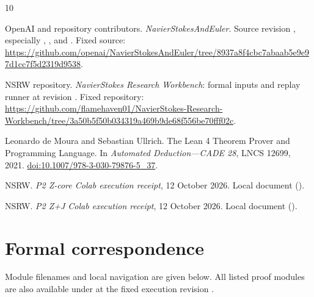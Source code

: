 \documentclass[11pt,a4paper]{article}
\begin{document}
\begin{thebibliography}{10}

OpenAI and repository contributors. \emph{NavierStokesAndEuler}. Source revision , especially , ,  and . Fixed source: \url{https://github.com/openai/NavierStokesAndEuler/tree/8937a8f4cbc7abaab5e9e97d1cc7f5d2319d9538}.

NSRW repository. \emph{NavierStokes Research Workbench}: formal inputs and replay runner at revision . Fixed repository: \url{https://github.com/flamehaven01/NavierStokes-Research-Workbench/tree/3a50b5f50b034319a469b9de68f556be70fff02c}.

Leonardo de Moura and Sebastian Ullrich. The Lean 4 Theorem Prover and Programming Language. In \emph{Automated Deduction---CADE 28}, LNCS 12699, 2021. \href{https://doi.org/10.1007/978-3-030-79876-5_37}{doi:10.1007/978-3-030-79876-5\_37}.

NSRW. \emph{P2 Z-core Colab execution receipt}, 12 October 2026. Local document ().

NSRW. \emph{P2 Z+J Colab execution receipt}, 12 October 2026. Local document ().

\end{thebibliography}
\appendix
\section{Formal correspondence}

Module filenames and local navigation are given below. All listed proof modules are also available under  at the fixed execution revision \cite{ref2}.
\end{document}
